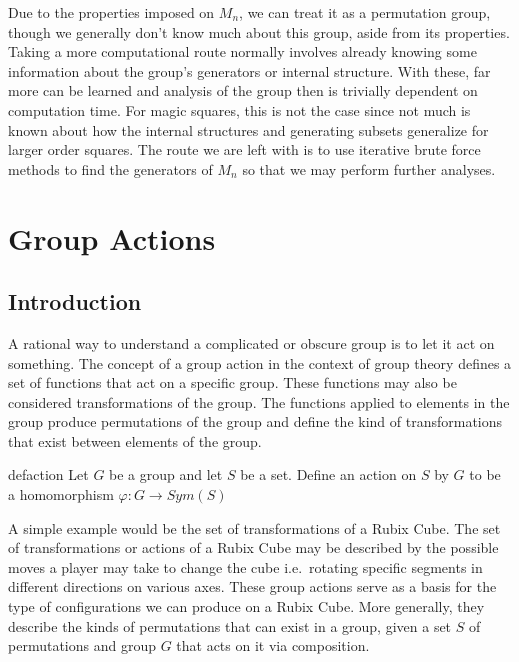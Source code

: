 \documentclass[12pt]{report}
\begin{document}
\par Due to the properties imposed on $M_n$, we can treat it as a permutation group, though we
generally don't know much about this group, aside from its properties. Taking a more computational
route normally involves already knowing some information about the group's generators or internal
structure. With these, far more can be learned and analysis of the group then is trivially
dependent on computation time. For magic squares, this is not the case since not much is known
about how the internal structures and generating subsets generalize for larger order squares. The
route we are left with is to use iterative brute force methods to find the generators of $M_n$ so
that we may perform further analyses.

\chapter{Group Actions}

\section{Introduction}

\par A rational way to understand a complicated or obscure group is to let it act on something. The
concept of a group action in the context of group theory defines a set of functions that act on a
specific group. These functions may also be considered transformations of the group. The functions
applied to elements in the group produce permutations of the group and define the kind of
transformations that exist between elements of the group.

\singlespacing{}
\begin{defbox}{}{defaction}
  Let $G$ be a group and let $S$ be a set. Define an action on $S$ by $G$ to be a homomorphism
  $\varphi:G\rightarrow Sym\left(S\right)$
\end{defbox}
\doublespacing{}

A simple example would be the set of transformations of a Rubix Cube. The set of transformations or
actions of a Rubix Cube may be described by the possible moves a player may take to change the cube
i.e.\ rotating specific segments in different directions on various axes. These group actions serve
as a basis for the type of configurations we can produce on a Rubix Cube. More generally, they
describe the kinds of permutations that can exist in a group, given a set $S$ of permutations and
group $G$ that acts on it via composition.
\end{document}
